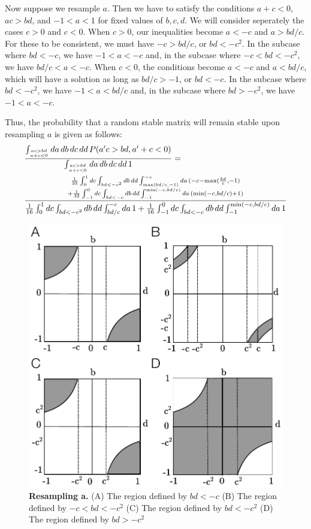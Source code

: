 \documentclass{amsart}
\theoremstyle{definition}
\theoremstyle{remark}
\numberwithin{equation}{section}
\begin{document}
Now suppose we resample $a$.  Then we have to satisfy the conditions
$a + c < 0$, $ac > bd$, and $-1 < a < 1$ for fixed values of $b,c,d$.  We will
consider seperately the cases $c > 0$ and $c < 0$.  When $c > 0$, our
inequalities become $a < -c$ and $a > bd/c$.  For these to be
consistent, we must have $-c > bd/c$, or $bd < -c^2$.  In the subcase where $bd < -c$, we have $-1 < a < -c$ and, in the subcase where $-c < bd < -c^2$, we have $bd/c < a < -c$. When $c < 0$, the conditions become $a < -c$ and
$a < bd/c$, which will have a solution as long as $bd/c > -1$, or $bd
< -c$.  In the subcase where $bd < -c^2$, we have $-1 < a < bd/c$ and, in the subcase where $bd > -c^2$, we have $-1 < a < -c$.

Thus, the probability that a random stable matrix will remain stable upon resampling $a$ is given as follows:
\begin{align*}
&\frac{\int_{ac>bd \atop a+c<0} da\,db\,dc\,dd\,
  P(a'c>bd, a'+c < 0)}{\int_{ac>bd \atop a+c<0} da\,db\,dc\,dd\,1} = \\
&\frac{\genfrac{}{}{0pt}{}{{1 \over 32} \int_0^1 dc \int_{bd < -c^2} db\,dd \int_{\max(bd/c,-1)}^{-c} da \,
(-c - \max({bd \over c},-1)}{+
{1 \over 32} \int_{-1}^0 dc \int_{bd < -c} db\,dd \int_{-1}^{\min(-c,
bd/c)} da\, (\min(-c, bd/c) + 1)}}{{1 \over 16} \int_0^1 dc \int_{bd < -c^2} db\,dd \int_{bd/c}^{-c} da\,1
+
{1 \over 16} \int_{-1}^0 dc \int_{bd < -c} db\,dd \int_{-1}^{\min(-c, bd/c)} da\,1}
\end{align*}

\begin{figure}[!ht]
\centering
\noindent\includegraphics[width=0.5\columnwidth]{fig/2x2-resample-a.pdf}
\caption{{\bf Resampling a.} (A) The region defined by $bd < -c$ (B) The region defined by $-c < bd < -c^2$ (C) The region defined by $bd < -c^2$ (D) The region defined by $bd > -c^2$}
\label{fig:2x2-resample-a}
\end{figure}
\end{document}
